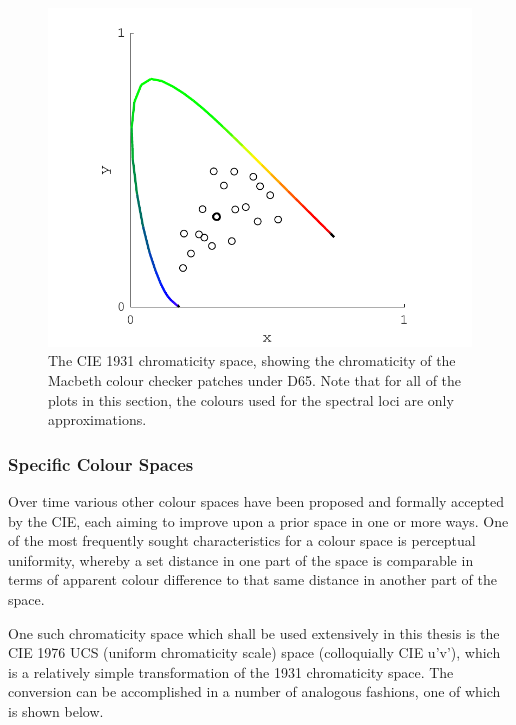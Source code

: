 
\begin{figure}[htbp]
\includegraphics[max width=\textwidth]{figs/LitRev/ColorimetryDemo1.pdf}
\caption{The \gls{CIE} 1931 chromaticity space, showing the chromaticity of the Macbeth colour checker patches under D65. Note that for all of the plots in this section, the colours used for the spectral loci are only approximations.}
\label{fig:1931}
\end{figure}

\subsubsection{Specific Colour Spaces} \label{sec:speccolspac}

Over time various other colour spaces have been proposed and formally accepted by the \gls{CIE}, each aiming to improve upon a prior space in one or more ways. One of the most frequently sought characteristics for a colour space is perceptual uniformity, whereby a set distance in one part of the space is comparable in terms of apparent colour difference to that same distance in another part of the space.

One such chromaticity space which shall be used extensively in this thesis is the \gls{CIE} 1976 UCS (uniform chromaticity scale) space (colloquially \gls{CIE} u'v'), which is a relatively simple transformation of the 1931 chromaticity space. The conversion can be accomplished in a number of analogous fashions, one of which is shown below.

